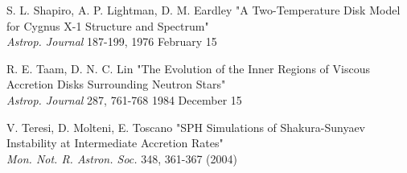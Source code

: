\documentclass[a4paper]{article}
\begin{document}
\begin{thebibliography}{9}
	S. L. Shapiro, A. P. Lightman, D. M. Eardley 
	"A Two-Temperature Disk Model for Cygnus X-1 Structure and Spectrum"\\
	\textit{Astrop. Journal} 187-199, 1976 February 15
	
	R. E. Taam, D. N. C. Lin 
	"The Evolution of the Inner Regions of Viscous Accretion Disks Surrounding Neutron Stars"\\
	\textit{Astrop. Journal} 287, 761-768 1984 December 15

	V. Teresi, D. Molteni, E. Toscano 
	"SPH Simulations of Shakura-Sunyaev Instability at Intermediate Accretion Rates"\\
	\textit{Mon. Not. R. Astron. Soc.} 348, 361-367 (2004)
\end{thebibliography}
\end{document}
